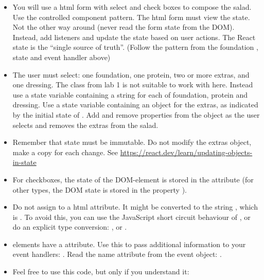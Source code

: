 \documentclass[fleqn, article, a4paper]{memoir}
\begin{document}
\begin{Assignments}
\begin{itemize}
  \item You will use a html form with select and check boxes to compose the salad. Use the controlled component pattern. The html form must view the  state. Not the other way around (never read the form state from the DOM). Instead, add listeners and update the state based on user actions. The React state is the ``single source of truth''. (Follow the pattern from the foundation , state and event handler above)
  
  \item The user must select: one foundation, one protein, two or more extras, and one dressing. The  class from lab 1 is not suitable to work with here. Instead use a state variable containing a string for each of foundation, protein and dressing. Use a state variable containing an object for the extras, as indicated by the initial state of . Add and remove properties from the object as the user selects and removes the extras from the salad.

  \item Remember that state must be immutable. Do not modify the extras object, make a copy for each change. See \url{https://react.dev/learn/updating-objects-in-state}

  \item For checkboxes, the state of the DOM-element is stored in the attribute  (for other  types, the DOM state is stored in the property ).
  
  \item Do not assign  to a html attribute. It might be converted to the string , which is . To avoid this, you can use the JavaScript short circuit behaviour of \code{||} , or do an explicit type conversion: , or .

  \item {} elements have a  attribute. Use this to pass additional information to your event handlers:
  . Read the name  attribute from the event object: .

  \item Feel free to use this code, but only if you understand it: \\
  

\end{itemize}
\end{Assignments}
\end{document}

